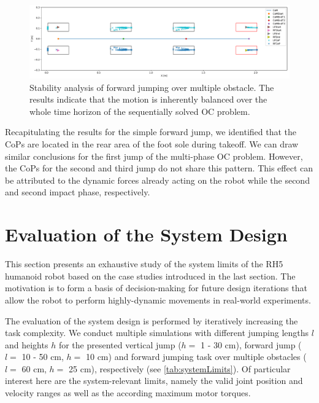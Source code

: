 \begin{figure}[h!]
\centering	
\includegraphics[width=1\textwidth]{fig/jumpObstacles/StabilityAnalysis}
\caption[Stability analysis of forward jumping over multiple obstacle]{Stability analysis of forward jumping over multiple obstacle. The results indicate that the motion is inherently balanced over the whole time horizon of the sequentially solved \gls{OC} problem.}
\label{fig:jumpObstacles_StabilityAnalysis}
\end{figure}

Recapitulating the results for the simple forward jump, we identified that the \gls{CoP}s are located in the rear area of the foot sole during takeoff. We can draw similar conclusions for the first jump of the multi-phase \gls{OC} problem. However, the \gls{CoP}s for the second and third jump do not share this pattern. This effect can be attributed to the dynamic forces already acting on the robot while the second and second impact phase, respectively.


\section{Evaluation of the System Design}\label{sec:HighlyEvaluation}

This section presents an exhaustive study of the system limits of the RH5 humanoid robot based on the case studies introduced in the last section. The motivation is to form a basis of decision-making for future design iterations that allow the robot to perform highly-dynamic movements in real-world experiments.

The evaluation of the system design is performed by iteratively increasing the task complexity. We conduct multiple simulations with different jumping lengths $l$ and heights $h$ for the presented vertical jump ($h=$ 1 - 30 cm), forward jump ($l=$ 10 - 50 cm, $h=$ 10 cm) and forward jumping task over multiple obstacles ($l=$ 60 cm, $h=$ 25 cm), respectively (see \cref{tab:systemLimits}). Of particular interest here are the system-relevant limits, namely the valid  joint position and velocity ranges as well as the according maximum  motor torques. 

